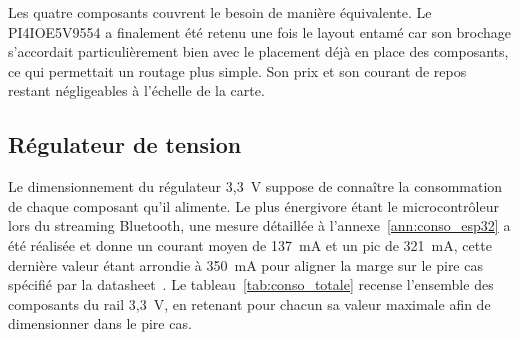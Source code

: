 Les quatre composants couvrent le besoin de manière équivalente. Le PI4IOE5V9554 a finalement été retenu une fois le layout entamé car son brochage s'accordait particulièrement bien avec le placement déjà en place des composants, ce qui permettait un routage plus simple. Son prix et son courant de repos restant négligeables à l'échelle de la carte.






\subsection{Régulateur de tension}
\label{sec:topologie_buck}

Le dimensionnement du régulateur 3,3~V suppose de connaître la consommation de chaque composant qu'il alimente. Le plus énergivore étant le microcontrôleur lors du streaming Bluetooth, une mesure détaillée à l'annexe~\ref{ann:conso_esp32} a été réalisée et donne un courant moyen de 137~mA et un pic de 321~mA, cette dernière valeur étant arrondie à 350~mA pour aligner la marge sur le pire cas spécifié par la datasheet~\cite{ESP32_Datasheet}. Le tableau~\ref{tab:conso_totale} recense l'ensemble des composants du rail 3,3~V, en retenant pour chacun sa valeur maximale afin de dimensionner dans le pire cas.

